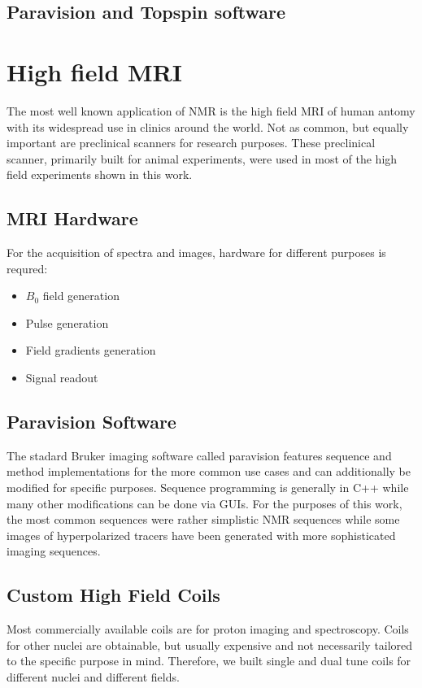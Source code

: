 		\subsection{Paravision and Topspin software}
	\section{High field MRI}
		The most well known application of NMR is the high field MRI of human antomy with its
		widespread use in clinics around the world. Not as common, but equally important are
		preclinical scanners for research purposes. These preclinical scanner, primarily built for
		animal experiments, were used in most of the high field experiments shown in this work.
		\subsection{MRI Hardware}
			For the acquisition of spectra and images, hardware for different purposes is requred:
			\begin{itemize}
			\item $B_0$ field generation
			\item Pulse generation
			\item Field gradients generation
			\item Signal readout
			\end{itemize}
		\subsection{Paravision Software}
			The stadard Bruker imaging software called paravision features sequence and method
			implementations for the more common use cases and can additionally be modified for
			specific purposes. Sequence programming is generally in C++ while many other
			modifications can be done via GUIs.
			For the purposes of this work, the most common sequences were rather simplistic NMR
			sequences while some images of hyperpolarized tracers have been generated with more
			sophisticated imaging sequences.
		\subsection{Custom High Field Coils}
			Most commercially available coils are for proton imaging and spectroscopy. Coils for
			other nuclei are obtainable, but usually expensive and not necessarily tailored to the
			specific purpose in mind. Therefore, we built single and dual tune coils for different
			nuclei and different fields.
